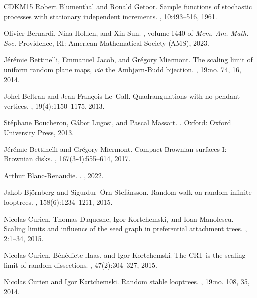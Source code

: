 \documentclass[british, a4paper,11pt]{article}
\numberwithin{equation}{section}
\theoremstyle{definition}
\begin{document}
{\begin{thebibliography}{CDKM15}
Robert Blumenthal and Ronald Getoor.
\newblock Sample functions of stochastic processes with stationary independent
  increments.
, 10:493--516, 1961.

Olivier Bernardi, Nina Holden, and Xin Sun.
, volume 1440 of {\em Mem. Am. Math. Soc.}
\newblock Providence, RI: American Mathematical Society (AMS), 2023.

J{\'e}r{\'e}mie Bettinelli, Emmanuel Jacob, and Gr{\'e}gory Miermont.
\newblock The scaling limit of uniform random plane maps, {\it via} the
  {A}mbj\o rn-{B}udd bijection.
, 19:no. 74, 16, 2014.

Johel Beltran and Jean-Fran{\c{c}}ois Le~Gall.
\newblock Quadrangulations with no pendant vertices.
, 19(4):1150--1175, 2013.

St\'ephane Boucheron, G\'abor Lugosi, and Pascal Massart.
.
\newblock Oxford: Oxford University Press, 2013.

J\'er\'emie Bettinelli and Gr\'egory Miermont.
\newblock Compact {B}rownian surfaces {I}: {B}rownian disks.
, 167(3-4):555--614, 2017.

Arthur Blanc-Renaudie.
.
, 2022.

Jakob Bj\"ornberg and Sigurdur~\"Orn Stef\'ansson.
\newblock Random walk on random infinite looptrees.
, 158(6):1234--1261, 2015.

Nicolas Curien, Thomas Duquesne, Igor Kortchemski, and Ioan Manolescu.
\newblock Scaling limits and influence of the seed graph in preferential
  attachment trees.
, 2:1--34, 2015.

Nicolas Curien, B{\'e}n{\'e}dicte Haas, and Igor Kortchemski.
\newblock The {CRT} is the scaling limit of random dissections.
, 47(2):304--327, 2015.

Nicolas Curien and Igor Kortchemski.
\newblock Random stable looptrees.
, 19:no. 108, 35, 2014.


\end{thebibliography}}
\end{document}
